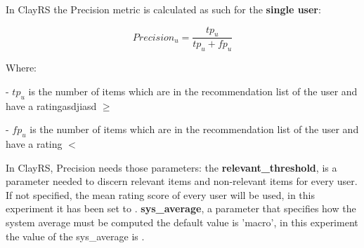 \documentclass[12pt, a4paper]{article}
\begin{document}
\hfill\break
In ClayRS the Precision metric is calculated as such for the \textbf{single user}:

    \[
    Precision_u = \frac{tp_u}{tp_u + fp_u}
    \]

    Where:

    - $tp_u$ is the number of items which are in the recommendation list of the user and have a
      ratingasdjiasd $\geq$ 
        \textbf{}
        \textbf{}


    - $fp_u$ is the number of items which are in the recommendation list of the user and have a
      rating $<$ 
        \textbf{}
        \textbf{}
    \hfill\break



In ClayRS, Precision needs those parameters:
\hfill\break
the \textbf{relevant\_threshold}, is a parameter needed to discern relevant items and non-relevant items for every user.
If not specified, the mean rating score of every user will be used, in this experiment it has been set to
\textbf{}.
\hfill\break\hfill\break
\textbf{sys\_average}, a parameter that specifies how the system average must be computed the default value is 'macro',
in this experiment the value of the sys\_average is \textbf{}.
\end{document}
